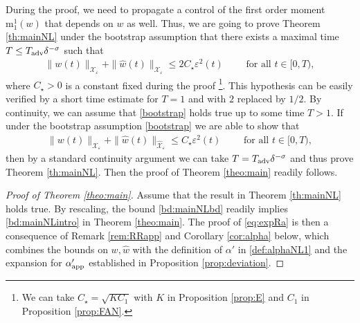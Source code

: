 \documentclass[11pt,reqno,a4paper]{amsart}
\def\eps{\varepsilon}
\newcommand{\cX}{\mathcal{X}}
\newcommand{\mrm}{\mathrm{m}}
\newcommand{\1}{\mathbbm{1}}
\theoremstyle{definition}
\theoremstyle{definition}
\numberwithin{equation}{section}
\begin{document}
During the proof, we need to propagate a control of the first order moment $\mrm^1_1(w)$ that depends on $w$ as well. Thus, we are going to prove Theorem \ref{th:mainNL} under the bootstrap assumption that there exists a maximal time $T\leq T_{\rm adv}\delta^{-\sigma}$ such that
\begin{align}
\label{bootstrap}\tag{B} \|w(t)\|_{\cX_\eps}+\|\widehat{w}(t)\|_{\widehat{\cX}_\eps}\leq 2C_\star\eps^2(t) \qquad \text{ for all }t\in [0,T),
\end{align}
where $C_\star>0$ is a constant fixed during the proof \footnote{We can take $C_\star=\sqrt{KC_1}$ with $K$ in Proposition \ref{prop:E} and $C_1$ in Proposition \ref{prop:FAN}.}.
This hypothesis can be easily verified by a short time estimate for $T=1$ and with $2$ replaced by $1/2$. By continuity, we can assume that \cref{bootstrap} holds true up to some time $T>1$. If  under the bootstrap assumption \cref{bootstrap} we are able to show that
        \begin{align} \|w(t)\|_{\cX_\eps}+\|\widehat{w}(t)\|_{\widehat{\cX}_\eps}\leq C_\star\eps^2(t) \qquad \text{ for all }t\in [0,T),
\end{align} 
then by a standard continuity argument we can take $T=T_{\rm adv}\delta^{-\sigma}$ and thus prove Theorem \ref{th:mainNL}. Then the proof of Theorem \ref{theo:main} readily follows.
\begin{proof}[Proof of Theorem \ref{theo:main}]
  Assume that the result in Theorem \ref{th:mainNL} holds true. By rescaling, the bound \cref{bd:mainNLbd} readily implies \cref{bd:mainNLintro} in Theorem \ref{theo:main}. The proof of \cref{eq:expRa} is then a consequence of Remark \ref{rem:RRapp} and Corollary \ref{cor:alpha} below, which combines the bounds on $w,\widehat{w}$ with the definition of $\alpha'$ in \cref{def:alphaNL1} and the expansion for $\alpha'_{\rm app}$ established in Proposition \ref{prop:deviation}.
\end{proof}
\end{document}
